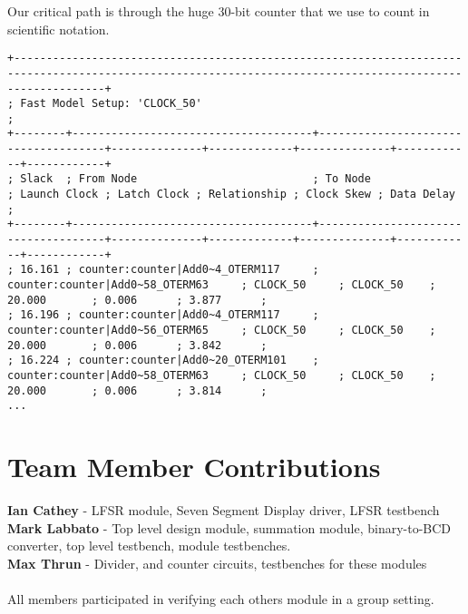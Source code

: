 \documentclass[12pt]{article}
\begin{document}
Our critical path is through the huge 30-bit counter that we use to count in scientific notation. 

\begin{verbatim}
+----------------------------------------------------------------------------------------------------------------------------------------------------------+
; Fast Model Setup: 'CLOCK_50'                                                                                                                             ;
+--------+-------------------------------------+-------------------------------------+--------------+-------------+--------------+------------+------------+
; Slack  ; From Node                           ; To Node                             ; Launch Clock ; Latch Clock ; Relationship ; Clock Skew ; Data Delay ;
+--------+-------------------------------------+-------------------------------------+--------------+-------------+--------------+------------+------------+
; 16.161 ; counter:counter|Add0~4_OTERM117     ; counter:counter|Add0~58_OTERM63     ; CLOCK_50     ; CLOCK_50    ; 20.000       ; 0.006      ; 3.877      ;
; 16.196 ; counter:counter|Add0~4_OTERM117     ; counter:counter|Add0~56_OTERM65     ; CLOCK_50     ; CLOCK_50    ; 20.000       ; 0.006      ; 3.842      ;
; 16.224 ; counter:counter|Add0~20_OTERM101    ; counter:counter|Add0~58_OTERM63     ; CLOCK_50     ; CLOCK_50    ; 20.000       ; 0.006      ; 3.814      ;
...
\end{verbatim}

\section*{Team Member Contributions}
\textbf{Ian Cathey} - LFSR module, Seven Segment Display driver, LFSR testbench \\
\textbf{Mark Labbato} - Top level design module, summation module, binary-to-BCD converter, top level testbench, module testbenches. \\
\textbf{Max Thrun} - Divider, and counter circuits, testbenches for these modules \\
\\
All members participated in verifying each others module in a group setting.
\end{document}
